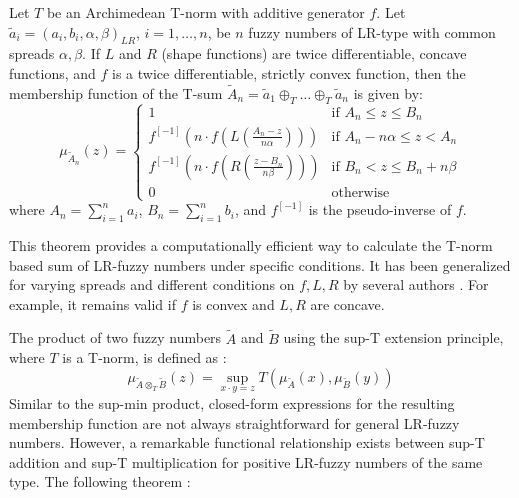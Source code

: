 \begin{theorem}
\label{thm:tnorm_addition_lr}
Let $T$ be an Archimedean T-norm with additive generator $f$. Let $\tilde{a}_i = (a_i, b_i, \alpha, \beta)_{LR}$, $i=1, \dots, n$, be $n$ fuzzy numbers of LR-type with common spreads $\alpha, \beta$. If $L$ and $R$ (shape functions) are twice differentiable, concave functions, and $f$ is a twice differentiable, strictly convex function, then the membership function of the T-sum $\tilde{A}_n = \tilde{a}_1 \oplus_T \dots \oplus_T \tilde{a}_n$ is given by:
\begin{equation}
\mu_{\tilde{A}_n}(z) =
\begin{cases}
1 & \text{if } A_n \le z \le B_n \\
f^{[-1]}\left( n \cdot f\left(L\left(\frac{A_n-z}{n\alpha}\right)\right) \right) & \text{if } A_n - n\alpha \le z < A_n \\
f^{[-1]}\left( n \cdot f\left(R\left(\frac{z-B_n}{n\beta}\right)\right) \right) & \text{if } B_n < z \le B_n + n\beta \\
0 & \text{otherwise}
\end{cases}
\end{equation}
where $A_n = \sum_{i=1}^n a_i$, $B_n = \sum_{i=1}^n b_i$, and $f^{[-1]}$ is the pseudo-inverse of $f$.
\end{theorem}
\begin{remark}
This theorem provides a computationally efficient way to calculate the T-norm based sum of LR-fuzzy numbers under specific conditions. It has been generalized for varying spreads and different conditions on $f, L, R$ by several authors \cite[p.29]{FULLER2}. For example, it remains valid if $f$ is convex and $L,R$ are concave.
\end{remark}
The product of two fuzzy numbers $\tilde{A}$ and $\tilde{B}$ using the sup-T extension principle, where $T$ is a T-norm, is defined as \cite[p.20]{FULLER2}:
\begin{equation}
\mu_{\tilde{A} \otimes_T \tilde{B}}(z) = \sup_{x \cdot y = z} T(\mu_{\tilde{A}}(x), \mu_{\tilde{B}}(y))
\end{equation}
Similar to the sup-min product, closed-form expressions for the resulting membership function are not always straightforward for general LR-fuzzy numbers. However, a remarkable functional relationship exists between sup-T addition and sup-T multiplication for positive LR-fuzzy numbers of the same type. The following theorem \cite[Thm. 1.8.1]{FULLER2}:

